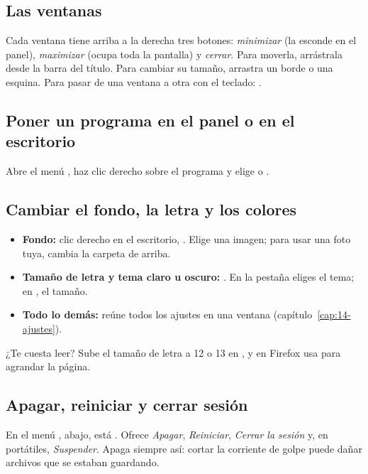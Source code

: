 \subsection{Las ventanas}
Cada ventana tiene arriba a la derecha tres botones: \emph{minimizar}
(la esconde en el panel), \emph{maximizar} (ocupa toda la pantalla) y
\emph{cerrar}. Para moverla, arrástrala desde la barra del título. Para
cambiar su tamaño, arrastra un borde o una esquina. Para pasar de una
ventana a otra con el teclado: .

\subsection{Poner un programa en el panel o en el escritorio}
Abre el menú , haz clic derecho sobre el programa y
elige  o .

\subsection{Cambiar el fondo, la letra y los colores}
\begin{itemize}
  \item \textbf{Fondo:} clic derecho en el escritorio, . Elige una imagen; para usar una foto tuya, cambia la
        carpeta de arriba.
  \item \textbf{Tamaño de letra y tema claro u oscuro:}
        . En la pestaña
         eliges el tema; en , el tamaño.
  \item \textbf{Todo lo demás:}  reúne todos los ajustes en una ventana
        (capítulo~\ref{cap:14-ajustes}).
\end{itemize}

\begin{consejo}
¿Te cuesta leer? Sube el tamaño de letra a 12 o 13 en , y en Firefox usa \keys{\ctrl + +} para agrandar la página.
\end{consejo}

\subsection{Apagar, reiniciar y cerrar sesión}
En el menú , abajo, está . Ofrece
\emph{Apagar}, \emph{Reiniciar}, \emph{Cerrar la sesión} y, en portátiles,
\emph{Suspender}. Apaga siempre así: cortar la corriente de golpe puede
dañar archivos que se estaban guardando.

